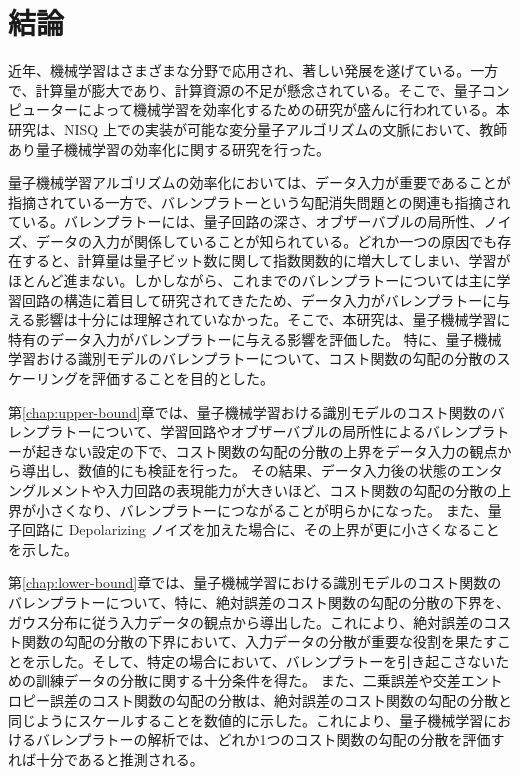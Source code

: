 \chapter{結論}

近年、機械学習はさまざまな分野で応用され、著しい発展を遂げている。一方で、計算量が膨大であり、計算資源の不足が懸念されている。そこで、量子コンピューターによって機械学習を効率化するための研究が盛んに行われている。本研究は、NISQ 上での実装が可能な変分量子アルゴリズムの文脈において、教師あり量子機械学習の効率化に関する研究を行った。

量子機械学習アルゴリズムの効率化においては、データ入力が重要であることが指摘されている一方で、バレンプラトーという勾配消失問題との関連も指摘されている。バレンプラトーには、量子回路の深さ、オブザーバブルの局所性、ノイズ、データの入力が関係していることが知られている。どれか一つの原因でも存在すると、計算量は量子ビット数に関して指数関数的に増大してしまい、学習がほとんど進まない。しかしながら、これまでのバレンプラトーについては主に学習回路の構造に着目して研究されてきたため、データ入力がバレンプラトーに与える影響は十分には理解されていなかった。そこで、本研究は、量子機械学習に特有のデータ入力がバレンプラトーに与える影響を評価した。
特に、量子機械学習おける識別モデルのバレンプラトーについて、コスト関数の勾配の分散のスケーリングを評価することを目的とした。

第\ref{chap:upper-bound}章では、量子機械学習おける識別モデルのコスト関数のバレンプラトーについて、学習回路やオブザーバブルの局所性によるバレンプラトーが起きない設定の下で、コスト関数の勾配の分散の上界をデータ入力の観点から導出し、数値的にも検証を行った。
その結果、データ入力後の状態のエンタングルメントや入力回路の表現能力が大きいほど、コスト関数の勾配の分散の上界が小さくなり、バレンプラトーにつながることが明らかになった。
また、量子回路に Depolarizing ノイズを加えた場合に、その上界が更に小さくなることを示した。

第\ref{chap:lower-bound}章では、量子機械学習における識別モデルのコスト関数のバレンプラトーについて、特に、絶対誤差のコスト関数の勾配の分散の下界を、ガウス分布に従う入力データの観点から導出した。これにより、絶対誤差のコスト関数の勾配の分散の下界において、入力データの分散が重要な役割を果たすことを示した。そして、特定の場合において、バレンプラトーを引き起こさないための訓練データの分散に関する十分条件を得た。
また、二乗誤差や交差エントロピー誤差のコスト関数の勾配の分散は、絶対誤差のコスト関数の勾配の分散と同じようにスケールすることを数値的に示した。これにより、量子機械学習におけるバレンプラトーの解析では、どれか1つのコスト関数の勾配の分散を評価すれば十分であると推測される。

